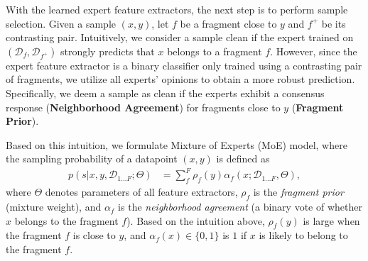 \documentclass{article}
\def\ie{\textit{i.e}., } \def\Ie{\textit{I.e}., }
\theoremstyle{plain}
\theoremstyle{definition}
\theoremstyle{remark}
\begin{document}
With the learned expert feature extractors, the next step is to perform sample selection.
Given a sample $(x, y)$, let $f$ be a fragment close to $y$ and $f^+$ be its contrasting pair.
Intuitively, we consider a sample clean if the expert trained on $(\mathcal{D}_f, \mathcal{D}_{f^+})$ strongly predicts that $x$ belongs to a fragment $f$.
However, since the expert feature extractor is a binary classifier only trained using a contrasting pair of fragments, we utilize all experts' opinions to obtain a more robust prediction. %
Specifically, we deem a sample as clean if the experts exhibit a consensus response (\textbf{Neighborhood Agreement}) for fragments close to $y$ (\textbf{Fragment Prior}).

Based on this intuition, we formulate Mixture of Experts (MoE) \citep{jacobs1991MoE} model, where the sampling probability of a datapoint $(x, y)$ is defined as
\begin{align}\label{eq:mcf}
    p(s|x,y, \mathcal{D}_{1 \ldots F};\Theta) &= \sum_{f}^{F} \rho_f(y)\alpha_f(x; \mathcal{D}_{1 \ldots F}, \Theta),
\end{align}
where $\Theta$ denotes parameters of all  feature extractors, $\rho_f$ is the \textit{fragment prior} (mixture weight), and $\alpha_f$ is the \textit{neighborhood agreement} (a binary vote  of whether $x$ belongs to the fragment $f$).
Based on the intuition above, $\rho_f(y)$ is large when the fragment $f$ is close to $y$, and $\alpha_f(x) \in \{0, 1\}$ is $1$ if $x$ is likely to belong to the fragment $f$.%
\end{document}
